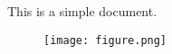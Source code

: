 \documentclass{article}
\begin{document}
This is a simple document.

\begin{figure}
    \texttt{[image: figure.png]}
\end{figure}
\end{document}
